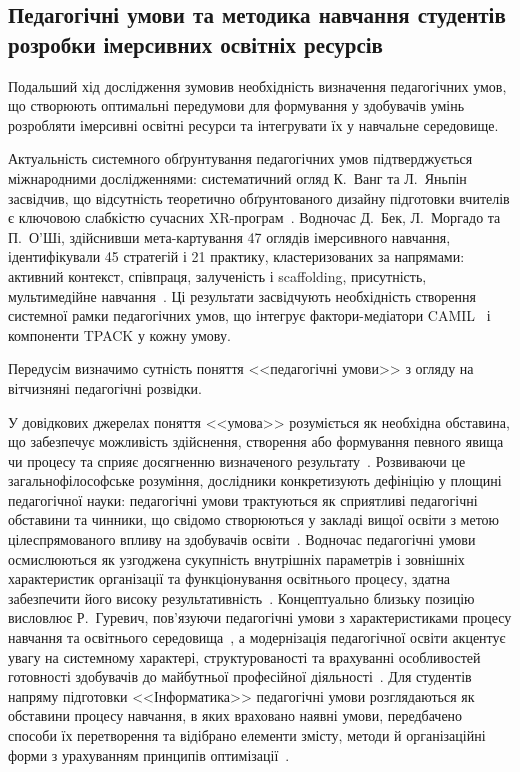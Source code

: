 \subsection{Педагогічні умови та методика навчання студентів розробки імерсивних освітніх ресурсів}\label{subsec:2.3}

Подальший хід дослідження зумовив необхідність визначення педагогічних умов, що створюють оптимальні передумови для формування у здобувачів умінь розробляти імерсивні освітні ресурси та інтегрувати їх у навчальне середовище.

Актуальність системного обґрунтування педагогічних умов підтверджується міжнародними дослідженнями: систематичний огляд К.~Ванг та Л.~Яньпін засвідчив, що відсутність теоретично обґрунтованого дизайну підготовки вчителів є ключовою слабкістю сучасних XR-програм~\cite{Wang2024XRTeacherEd}. Водночас Д.~Бек, Л.~Моргадо та П.~О'Ші, здійснивши мета-картування 47 оглядів імерсивного навчання, ідентифікували 45 стратегій і 21 практику, кластеризованих за напрямами: активний контекст, співпраця, залученість і scaffolding, присутність, мультимедійне навчання~\cite{Beck2024Practices}. Ці результати засвідчують необхідність створення системної рамки педагогічних умов, що інтегрує фактори-медіатори CAMIL~\cite{Makransky2021CAMIL} і компоненти TPACK у кожну умову.

Передусім визначимо сутність поняття <<педагогічні умови>> з огляду на вітчизняні педагогічні розвідки.

У довідкових джерелах поняття <<умова>> розуміється як необхідна обставина, що забезпечує можливість здійснення, створення або формування певного явища чи процесу та сприяє досягненню визначеного результату~\cite[c.~1506]{VTSSM2005}. Розвиваючи це загальнофілософське розуміння, дослідники конкретизують дефініцію у площині педагогічної науки: педагогічні умови трактуються як сприятливі педагогічні обставини та чинники, що свідомо створюються у закладі вищої освіти з метою цілеспрямованого впливу на здобувачів освіти~\cite[c.~32]{Yezhova2020Ref}. Водночас педагогічні умови осмислюються як узгоджена сукупність внутрішніх параметрів і зовнішніх характеристик організації та функціонування освітнього процесу, здатна забезпечити його високу результативність~\cite{Manko2000Conditions}. Концептуально близьку позицію висловлює Р.~Гуревич, пов'язуючи педагогічні умови з характеристиками процесу навчання та освітнього середовища~\cite{Gurevych2012Pedagogy}, а модернізація педагогічної освіти акцентує увагу на системному характері, структурованості та врахуванні особливостей готовності здобувачів до майбутньої професійної діяльності~\cite{Andrushchenko2018Prof}. Для студентів напряму підготовки <<Інформатика>> педагогічні умови розглядаються як обставини процесу навчання, в яких враховано наявні умови, передбачено способи їх перетворення та відібрано елементи змісту, методи й організаційні форми з урахуванням принципів оптимізації~\cite{Vdovychyn2015Conditions, Goncharenko2011Pedagogy, Pometun2004Interactive}.

